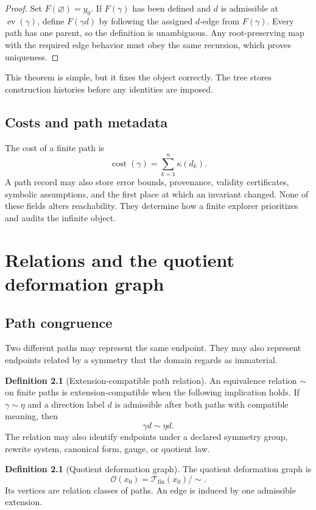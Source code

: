 \documentclass[11pt,openany]{report}
\theoremstyle{definition}
\newtheorem{definition}[theorem]{Definition}
\theoremstyle{remark}
\newcommand{\Tcal}{\mathcal T}
\newcommand{\Ocal}{\mathcal O}
\newcommand{\cost}{\operatorname{cost}}
\newcommand{\ev}{\operatorname{ev}}
\begin{document}
\begin{proof}
Set $F(\varnothing)=y_0$. If $F(\gamma)$ has been defined and $d$ is admissible at $\ev(\gamma)$, define $F(\gamma d)$ by following the assigned $d$-edge from $F(\gamma)$. Every path has one parent, so the definition is unambiguous. Any root-preserving map with the required edge behavior must obey the same recursion, which proves uniqueness.
\end{proof}

This theorem is simple, but it fixes the object correctly. The tree stores construction histories before any identities are imposed.

\section{Costs and path metadata}

The cost of a finite path is
\[
\cost(\gamma)=\sum_{k=1}^n\kappa(d_k).
\]
A path record may also store error bounds, provenance, validity certificates, symbolic assumptions, and the first place at which an invariant changed. None of these fields alters reachability. They determine how a finite explorer prioritizes and audits the infinite object.

\chapter{Relations and the quotient deformation graph}

\section{Path congruence}

Two different paths may represent the same endpoint. They may also represent endpoints related by a symmetry that the domain regards as immaterial.

\begin{definition}[Extension-compatible path relation]
An equivalence relation $\sim$ on finite paths is extension-compatible when the following implication holds. If $\gamma\sim\eta$ and a direction label $d$ is admissible after both paths with compatible meaning, then
\[
\gamma d\sim\eta d.
\]
The relation may also identify endpoints under a declared symmetry group, rewrite system, canonical form, gauge, or quotient law.
\end{definition}

\begin{definition}[Quotient deformation graph]
The quotient deformation graph is
\[
\boxed{
\Ocal(x_0)=\Tcal_{\mathrm{fin}}(x_0)/\sim.
}
\]
Its vertices are relation classes of paths. An edge is induced by one admissible extension.
\end{definition}
\end{document}
